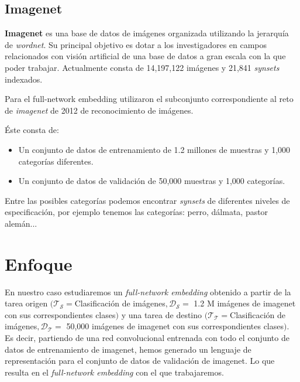 \documentclass[12,twoside]{TFG-GM}
\theoremstyle{definition}
\theoremstyle{remark}
\begin{document}
%
%

\subsection{Imagenet}

\textbf{Imagenet} es una base de datos de imágenes organizada utilizando la jerarquía de \textit{wordnet}. Su principal objetivo es dotar a los investigadores en campos relacionados con visión artificial de una base de datos a gran escala con la que poder trabajar. Actualmente consta de 14,197,122 imágenes y  21,841 \textit{synsets} indexados.  

Para el full-network embedding utilizaron el subconjunto correspondiente al reto de \textit{imagenet} de 2012 de reconocimiento de imágenes. 

Éste consta de:
\begin{itemize}
\item Un conjunto de datos de entrenamiento de 1.2 millones de muestras y 1,000 categorías diferentes.
\item Un conjunto de datos de validación de 50,000 muestras y 1,000 categorías. 
\end{itemize}

Entre las posibles categorías podemos encontrar \textit{synsets} de diferentes niveles de especificación, por ejemplo tenemos las categorías: perro, dálmata, pastor alemán... 
\newpage
\section{Enfoque}

En nuestro caso estudiaremos un \textit{full-network embedding} obtenido a partir de la tarea origen  $(\mathcal{T_S} = $Clasificación de imágenes$,\mathcal{D_S} =$ 1.2 M imágenes de imagenet con sus correspondientes clases$ )$ y una tarea de destino $(\mathcal{T_T} = $Clasificación de imágenes$,\mathcal{D_T} =$ 50,000 imágenes de imagenet con sus correspondientes clases$ )$. Es decir, partiendo de una red convolucional entrenada con todo el conjunto de datos de entrenamiento de imagenet, hemos generado un lenguaje de representación para el conjunto de datos de validación de imagenet. Lo que resulta en el \textit{full-network embedding} con el que trabajaremos. 
\end{document}
